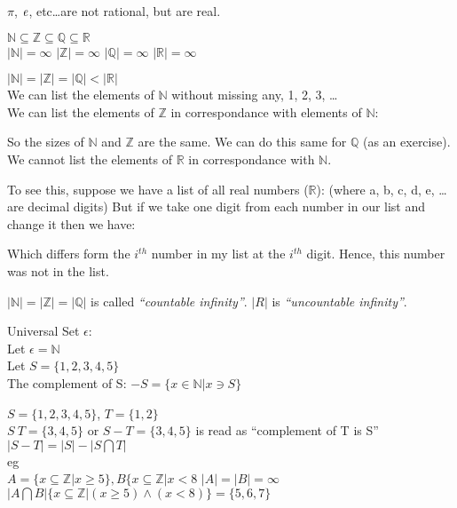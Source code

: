 $\pi$, $\emph{e}$, etc\ldots are not rational, but are real.

$\mathbb{N} \subseteq \mathbb{Z} \subseteq \mathbb{Q} \subseteq \mathbb{R} $ \\

$|\mathbb{N}| = \infty$
$|\mathbb{Z}| = \infty$
$|\mathbb{Q}| = \infty$
$|\mathbb{R}| = \infty$

$|\mathbb{N}| = |\mathbb{Z}| = |\mathbb{Q}| < |\mathbb{R}|$ \\
We can list the elements of $\mathbb{N}$ without missing any, 1, 2, 3, \ldots \\
We can list the elements of $\mathbb{Z}$ in correspondance with elements of $\mathbb{N}:$

%
%

So the sizes of $\mathbb{N}$ and $\mathbb{Z}$ are the same. We can do this same for $\mathbb{Q}$
(as an exercise). We cannot list the elements of $\mathbb{R}$ in correspondance with $\mathbb{N}$.

To see this, suppose we have a list of all real numbers ($\mathbb{R}$):
(where a, b, c, d, e, \ldots are decimal digits)
But if we take one digit from each number in our list and change it then we have:

Which differs form the $i^{th}$ number in my list at the $i^{th}$ digit. Hence, this
number was not in the list.

$|\mathbb{N}| = |\mathbb{Z}| = |\mathbb{Q}|$ is called \emph{``countable
infinity''}. $|R|$ is \emph{``uncountable infinity''}.

Universal Set $\epsilon$: \\
Let $\epsilon = \mathbb{N}$ \\
Let $S = \{1,2,3,4,5\}$ \\
The complement of S:
$ -S = \{ x \in \mathbb{N} | x \ni S \} $


$S = \{1,2,3,4,5\}$, $T = \{1,2\}$ \\
$S \ T=\{3, 4, 5\}$ or $S - T = \{3, 4, 5 \}$ is read as ``complement of T is S'' \\
$|S - T| = |S| - |S \bigcap T|$ \\
eg \\
$A = \{ x \subseteq \mathbb{Z} | x \geq 5 \}, B \{ x \subseteq \mathbb{Z} | x < 8 $
$|A| = |B| = \infty$
$|A \bigcap B | \{ x \subseteq \mathbb{Z} | (x \geq 5) \land (x < 8)\} = \{5,6,7\} $ 


